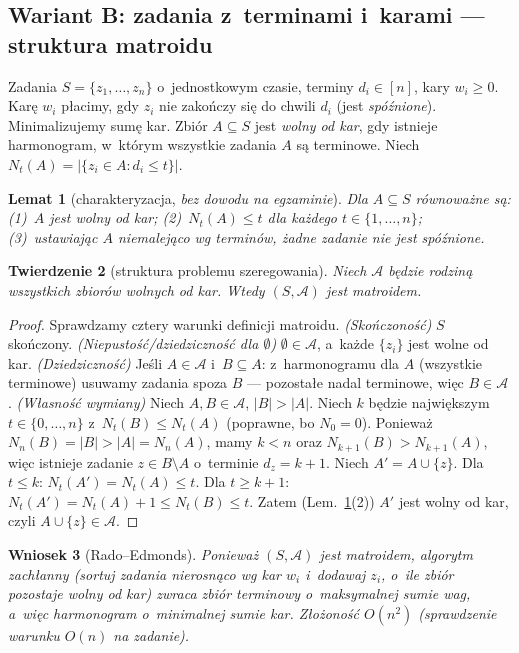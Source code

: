 \documentclass[11pt,a4paper]{article}
\theoremstyle{plain}
\newtheorem{twierdzenie}{Twierdzenie}[section]
\newtheorem{lemat}[twierdzenie]{Lemat}
\newtheorem{wniosek}[twierdzenie]{Wniosek}
\theoremstyle{definition}
\begin{document}
\subsection{Wariant B: zadania z~terminami i~karami --- struktura matroidu}
Zadania $S=\{z_1,\dots,z_n\}$ o~jednostkowym czasie, terminy $d_i\in[n]$, kary $w_i\ge0$. Karę $w_i$
płacimy, gdy $z_i$ nie zakończy się do chwili $d_i$ (jest \emph{spóźnione}). Minimalizujemy sumę kar.
Zbiór $A\subseteq S$ jest \emph{wolny od kar}, gdy istnieje harmonogram, w~którym wszystkie zadania $A$ są
terminowe. Niech $N_t(A)=|\{z_i\in A:d_i\le t\}|$.

\begin{lemat}[charakteryzacja, \emph{bez dowodu na egzaminie}]\label{lem:sched}
Dla $A\subseteq S$ równoważne są: (1)~$A$ jest wolny od kar; (2)~$N_t(A)\le t$ dla każdego $t\in\{1,\dots,n\}$;
(3)~ustawiając $A$ niemalejąco wg terminów, żadne zadanie nie jest spóźnione.
\end{lemat}

\begin{twierdzenie}[struktura problemu szeregowania]\label{tw:matroid}
Niech $\mathcal A$ będzie rodziną wszystkich zbiorów wolnych od kar. Wtedy $(S,\mathcal A)$ jest matroidem.
\end{twierdzenie}
\begin{proof}
Sprawdzamy cztery warunki definicji matroidu.
\emph{(Skończoność)} $S$ skończony.
\emph{(Niepustość/dziedziczność dla $\emptyset$)} $\emptyset\in\mathcal A$, a~każde $\{z_i\}$ jest wolne od kar.
\emph{(Dziedziczność)} Jeśli $A\in\mathcal A$ i~$B\subseteq A$: z~harmonogramu dla $A$ (wszystkie terminowe)
usuwamy zadania spoza $B$ --- pozostałe nadal terminowe, więc $B\in\mathcal A$.
\emph{(Własność wymiany)} Niech $A,B\in\mathcal A$, $|B|>|A|$. Niech $k$ będzie największym
$t\in\{0,\dots,n\}$ z~$N_t(B)\le N_t(A)$ (poprawne, bo $N_0=0$). Ponieważ $N_n(B)=|B|>|A|=N_n(A)$, mamy
$k<n$ oraz $N_{k+1}(B)>N_{k+1}(A)$, więc istnieje zadanie $z\in B\setminus A$ o~terminie $d_z=k+1$.
Niech $A'=A\cup\{z\}$. Dla $t\le k$: $N_t(A')=N_t(A)\le t$. Dla $t\ge k+1$: $N_t(A')=N_t(A)+1\le N_t(B)\le t$.
Zatem (Lem.~\ref{lem:sched}(2)) $A'$ jest wolny od kar, czyli $A\cup\{z\}\in\mathcal A$.
\end{proof}
\begin{wniosek}[Rado--Edmonds]
Ponieważ $(S,\mathcal A)$ jest matroidem, algorytm zachłanny (sortuj zadania nierosnąco wg kar $w_i$ i~dodawaj
$z_i$, o~ile zbiór pozostaje wolny od kar) zwraca zbiór terminowy o~maksymalnej sumie wag, a~więc harmonogram
o~minimalnej sumie kar. Złożoność $O(n^2)$ (sprawdzenie warunku $O(n)$ na zadanie).
\end{wniosek}
\end{document}
